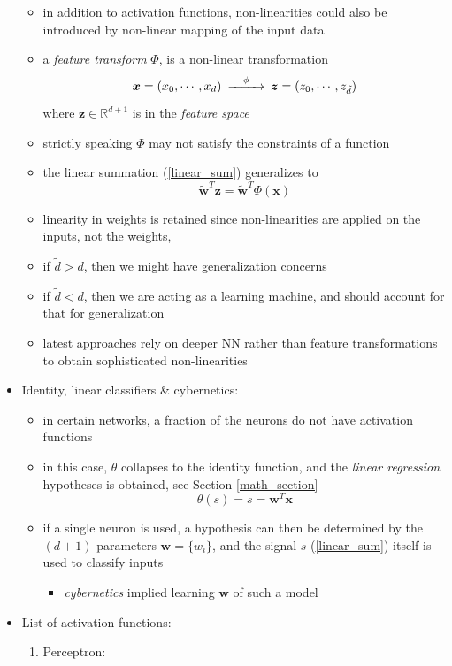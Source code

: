\documentclass[onecolumn]{IEEEtran}
\newcommand{\beq}{\begin{equation}}
\newcommand{\eeq}{\end{equation}}
\newcommand{\bi}{\begin{itemize}}
\newcommand{\ei}{\end{itemize}}
\begin{document}
\begin{itemize}
    \bi
       \item  in addition to activation functions, non-linearities could also be introduced by non-linear mapping of the input data
        \item a \emph{feature transform} $\Phi$, is a non-linear transformation
        \beq\begin{CD}
            \bm{x}= (x_0, \cdots , x_d) @>\phi>> \bm{z}= (z_0, \cdots , z_{\tilde{d}})
        \end{CD}\eeq
        where $\bm{z} \in \mathbb{R}^{\tilde{d}+1}$ is in the \emph{feature space}
        \item strictly speaking $\Phi$ may not satisfy the constraints of a function
        \item the linear summation (\ref{linear_sum}) generalizes to
        \beq\label{z_space}
              \bm{\tilde{w}}^T \bm{z} = \bm{\tilde{w}}^T \Phi(\bm{x})
        \eeq
        \item linearity in weights is retained since non-linearities are applied on the inputs, not the weights,
        \item if $\tilde{d} > d$, then we might have generalization concerns
        \item if $\tilde{d} < d$, then we are acting as a learning machine, and should account for that for generalization
        \item latest approaches rely on deeper NN rather than feature transformations to obtain sophisticated non-linearities
    \ei
    \item Identity, linear classifiers \& cybernetics:
    \bi
        \item in certain networks, a fraction of the neurons do not have activation functions
        \item in this case, $\theta$ collapses to the identity function, and the \emph{linear regression} hypotheses is obtained, see Section \ref{math_section}
            \beq
                \theta(s) = s = \bm{w}^T \bm{x}
            \eeq
        \item if a single neuron is used, a hypothesis can then be determined by the $(d+1)$ parameters $\bm{w}=\{w_i\}$, and the signal $s$ (\ref{linear_sum}) itself is used to classify inputs
        \bi
            \item \emph{cybernetics} implied learning $\bm{w}$ of such a model
        \ei
    \ei
    \item List of activation functions:
    \begin{enumerate}
        \item Perceptron:

\end{enumerate}
\end{itemize}
\end{document}
